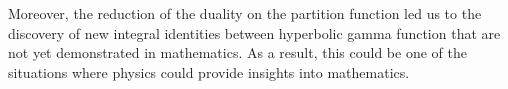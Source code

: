 Moreover, the reduction of the duality on the partition function led us to the discovery of new integral identities between hyperbolic gamma function that are not yet demonstrated in mathematics.
As a result, this could be one of the situations where physics could provide insights into mathematics.












